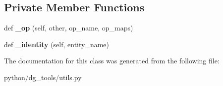 \subsection*{Private Member Functions}
\begin{DoxyCompactItemize}
\item 
def {\bfseries \+\_\+op} (self, other, op\+\_\+name, op\+\_\+maps)\hypertarget{classpython_1_1dg__tools_1_1utils_1_1BaseOperatorSignal_a73302dff859ab49d1635a98f3ce28f53}{}\label{classpython_1_1dg__tools_1_1utils_1_1BaseOperatorSignal_a73302dff859ab49d1635a98f3ce28f53}

\item 
def {\bfseries \+\_\+identity} (self, entity\+\_\+name)\hypertarget{classpython_1_1dg__tools_1_1utils_1_1BaseOperatorSignal_a21ebc77be0448e1636f185dc4142a0bf}{}\label{classpython_1_1dg__tools_1_1utils_1_1BaseOperatorSignal_a21ebc77be0448e1636f185dc4142a0bf}

\end{DoxyCompactItemize}


The documentation for this class was generated from the following file\+:\begin{DoxyCompactItemize}
\item 
python/dg\+\_\+tools/utils.\+py\end{DoxyCompactItemize}
